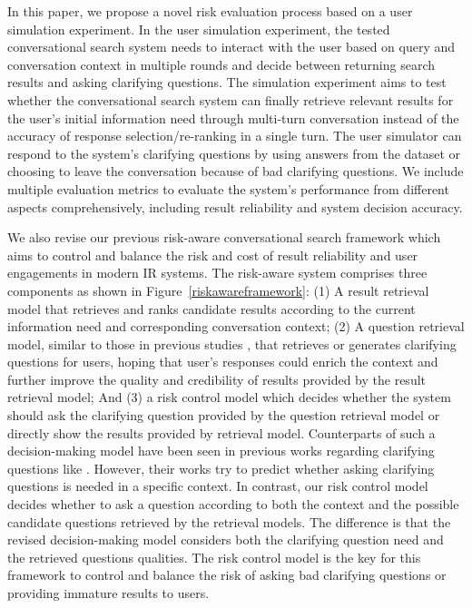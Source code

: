 \documentclass[format=acmsmall, review=False, screen=true]{acmart}
\begin{document}
In this paper, we propose a novel risk evaluation process based on a user simulation experiment. In the user simulation experiment, the tested conversational search system needs to interact with the user based on query and conversation context in multiple rounds and decide between returning search results and asking clarifying questions. The simulation experiment aims to test whether the conversational search system can finally retrieve relevant results for the user’s initial information need through multi-turn conversation instead of the accuracy of response selection/re-ranking in a single turn. The user simulator can respond to the system’s clarifying questions by using answers from the dataset or choosing to leave the conversation because of bad clarifying questions. We include multiple evaluation metrics to evaluate the system’s performance from different aspects comprehensively, including result reliability and system decision accuracy. 

We also revise our previous risk-aware conversational search framework \cite{wang2021controlling} which aims to control and balance the risk and cost of result reliability and user engagements in modern IR systems. The risk-aware system comprises three components as shown in Figure~\ref{riskawareframework}: (1) A result retrieval model that retrieves and ranks candidate results according to the current information need and corresponding conversation context; (2) A question retrieval model, similar to those in previous studies \cite{msdialogrank, askingcq}, that retrieves or generates clarifying questions for users, hoping that user’s responses could enrich the context and further improve the quality and credibility of results provided by the result retrieval model; And (3) a risk control model which decides whether the system should ask the clarifying question provided by the question retrieval model or directly show the results provided by retrieval model. Counterparts of such a decision-making model have been seen in previous works regarding clarifying questions like \cite{xuasking2019, aliannejadi2020convai3}. However, their works try to predict whether asking clarifying questions is needed in a specific context. In contrast, our risk control model decides whether to ask a question according to both the context and the possible candidate questions retrieved by the retrieval models. The difference is that the revised decision-making model considers both the clarifying question need and the retrieved questions qualities. The risk control model is the key for this framework to control and balance the risk of asking bad clarifying questions or providing immature results to users. 
\end{document}
